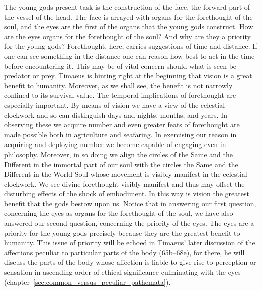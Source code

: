 The young gods present task is the construction of the face, the forward part of the vessel of the head. The face is arrayed with organs for the forethought of the soul, and the eyes are the first of the organs that the young gods construct. How are the eyes organs for the forethought of the soul? And why are they a priority for the young gods? Forethought, here, carries suggestions of time and distance. If one can see something in the distance one can reason how best to act in the time before encountering it. This may be of vital concern should what is seen be predator or prey. Timaeus is hinting right at the beginning that vision is a great benefit to humanity. Moreover, as we shall see, the benefit is not narrowly confined to its survival value. The temporal implications of forethought are especially important. By means of vision we have a view of the celestial clockwork and so can distinguish days and nights, months, and years. In observing these we acquire number and even greater feats of forethought are made possible both in agriculture and seafaring. In exercising our reason in acquiring and deploying number we become capable of engaging even in philosophy. Moreover, in so doing we align the circles of the Same and the Different in the immortal part of our soul with the circles the Same and the Different in the World-Soul whose movement is visibly manifest in the celestial clockwork. We see divine forethought visibly manifest and thus may offset the disturbing effects of the shock of embodiment. In this way is vision the greatest benefit that the gods bestow upon us. Notice that in answering our first question, concerning the eyes as organs for the forethought of the soul, we have also answered our second question, concerning the priority of the eyes. The eyes are a priority for the young gods precisely because they are the greatest benefit to humanity. This issue of priority will be echoed in Timaeus' later discussion of the affections peculiar to particular parts of the body (65b–68e), for there, he will discuss the parts of the body whose affection is liable to give rise to perception or sensation in ascending order of ethical significance culminating with the eyes (chapter~\ref{sec:common_versus_peculiar_pathemata}).

